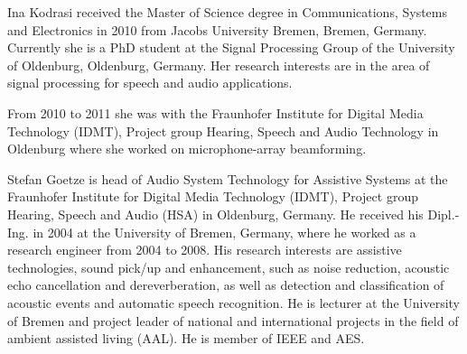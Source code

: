 \documentclass[draftcls,onecolumn,11pt]{IEEEtran}
\begin{document}




\begin{IEEEbiography}
{Ina Kodrasi} received the Master of Science degree in Communications, Systems and Electronics in 2010 from Jacobs University Bremen, Bremen, Germany.
Currently she is a PhD student at the Signal Processing Group of the University of Oldenburg, Oldenburg, Germany.
Her research interests are in the area of signal processing for speech and audio applications.

From 2010 to 2011 she was with the Fraunhofer Institute for Digital Media Technology (IDMT), Project group
Hearing, Speech and Audio Technology in Oldenburg where she worked on microphone-array beamforming.

\end{IEEEbiography}


\begin{IEEEbiography}{Stefan Goetze}
is head of Audio System Technology for Assistive Systems at the Fraunhofer Institute for Digital Media Technology (IDMT), Project group Hearing, Speech and Audio (HSA) in Oldenburg, Germany.
He received his Dipl.-Ing. in 2004 at the University of Bremen, Germany, where he worked as a research engineer from 2004 to 2008.
His research interests are assistive technologies, sound pick/up and enhancement, such as noise reduction, acoustic echo cancellation and dereverberation, as well as detection and classification of acoustic events and automatic speech recognition.
He is lecturer at the University of Bremen and project leader of national and international projects in the field of ambient assisted living (AAL).
He is member of IEEE and AES.
\end{IEEEbiography}
\end{document}
